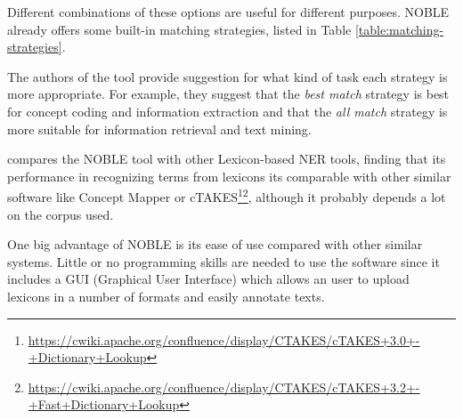 Different combinations of these options are useful for different purposes. NOBLE already offers some built-in matching strategies, listed in Table \ref{table:matching-strategies}.

\begin{table}[ht]
\centering
{}
\caption{NOBLE matching strategies present in the GUI interface. Adapted from \citep{Tseytlin2016}. This correspond to the options used in the GUI tool.}
\label{table:matching-strategies}
\end{table}

The authors of the tool provide suggestion for what kind of task each strategy is more appropriate. For example, they suggest that the \textit{best match} strategy is best for concept coding and information extraction and that the \textit{all match} strategy is more suitable for information retrieval and text mining.

\citep{Tseytlin2016} compares the NOBLE tool with other Lexicon-based NER tools, finding that its performance in recognizing terms from lexicons its comparable with other similar software like Concept Mapper\citep{Stewart} or cTAKES\footnote{\url{https://cwiki.apache.org/confluence/display/CTAKES/cTAKES+3.0+-+Dictionary+Lookup}}\footnote{\url{https://cwiki.apache.org/confluence/display/CTAKES/cTAKES+3.2+-+Fast+Dictionary+Lookup}}, although it probably depends a lot on the corpus used.

One big advantage of NOBLE is its ease of use compared with other similar systems. Little or no programming skills are needed to use the software since it includes a GUI (Graphical User Interface) which allows an user to upload lexicons in a number of formats and easily annotate texts.

